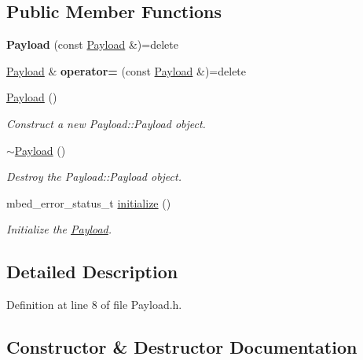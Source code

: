 \subsection*{Public Member Functions}
\begin{DoxyCompactItemize}
\item 
\mbox{\label{class_payload_a5751d22141f7d3340f71140b5885d898}} 
{\bfseries Payload} (const \mbox{\hyperlink{class_payload}{Payload}} \&)=delete
\item 
\mbox{\label{class_payload_a19146ac25baf7d79c3370db8abb114c3}} 
\mbox{\hyperlink{class_payload}{Payload}} \& {\bfseries operator=} (const \mbox{\hyperlink{class_payload}{Payload}} \&)=delete
\item 
\mbox{\hyperlink{class_payload_a2273069256ace43b81a84778a7da6039}{Payload}} ()
\begin{DoxyCompactList}\small\item\em Construct a new Payload\+::\+Payload object. \end{DoxyCompactList}\item 
\mbox{\hyperlink{class_payload_ae391ae4ea0e160ee9dd58c559bbf74f7}{$\sim$\+Payload}} ()
\begin{DoxyCompactList}\small\item\em Destroy the Payload\+::\+Payload object. \end{DoxyCompactList}\item 
mbed\+\_\+error\+\_\+status\+\_\+t \mbox{\hyperlink{class_payload_aa55a2da734e6950391d73b0837bbd3b9}{initialize}} ()
\begin{DoxyCompactList}\small\item\em Initialize the \mbox{\hyperlink{class_payload}{Payload}}. \end{DoxyCompactList}\end{DoxyCompactItemize}


\subsection{Detailed Description}


Definition at line 8 of file Payload.\+h.



\subsection{Constructor \& Destructor Documentation}
\mbox{\label{class_payload_a2273069256ace43b81a84778a7da6039}} 
